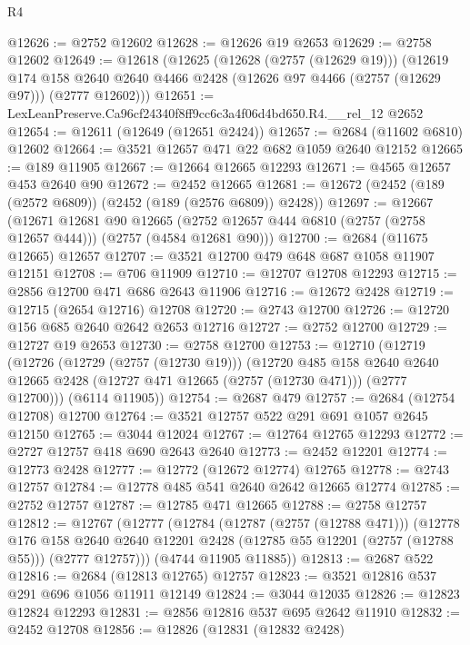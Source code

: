 \begin{lexlean}{R4}
\begin{coremodule}
@12626 := @2752 @12602
@12628 := @12626 @19 @2653
@12629 := @2758 @12602
@12649 := @12618
    (@12625
      (@12628 (@2757 (@12629 @19)))
      (@12619
        @174
        @158
        @2640
        @2640
        @4466
        @2428
        (@12626 @97 @4466 (@2757 (@12629 @97)))
        (@2777 @12602)))
@12651 := LexLeanPreserve.Ca96cf24340f8ff9cc6c3a4f06d4bd650.R4.__rel_12 @2652
@12654 := @12611 (@12649 (@12651 @2424))
@12657 := @2684 (@11602 @6810) @12602
@12664 := @3521 @12657 @471 @22 @682 @1059 @2640 @12152
@12665 := @189 @11905
@12667 := @12664 @12665 @12293
@12671 := @4565 @12657 @453 @2640 @90
@12672 := @2452 @12665
@12681 := @12672 (@2452 (@189 (@2572 @6809)) (@2452 (@189 (@2576 @6809)) @2428))
@12697 := @12667
    (@12671
      @12681
      @90
      @12665
      (@2752 @12657 @444 @6810 (@2757 (@2758 @12657 @444)))
      (@2757 (@4584 @12681 @90)))
@12700 := @2684 (@11675 @12665) @12657
@12707 := @3521 @12700 @479 @648 @687 @1058 @11907 @12151
@12708 := @706 @11909
@12710 := @12707 @12708 @12293
@12715 := @2856 @12700 @471 @686 @2643 @11906
@12716 := @12672 @2428
@12719 := @12715 (@2654 @12716) @12708
@12720 := @2743 @12700
@12726 := @12720 @156 @685 @2640 @2642 @2653 @12716
@12727 := @2752 @12700
@12729 := @12727 @19 @2653
@12730 := @2758 @12700
@12753 := @12710
    (@12719
      (@12726
        (@12729 (@2757 (@12730 @19)))
        (@12720
          @485
          @158
          @2640
          @2640
          @12665
          @2428
          (@12727 @471 @12665 (@2757 (@12730 @471)))
          (@2777 @12700)))
      (@6114 @11905))
@12754 := @2687 @479
@12757 := @2684 (@12754 @12708) @12700
@12764 := @3521 @12757 @522 @291 @691 @1057 @2645 @12150
@12765 := @3044 @12024
@12767 := @12764 @12765 @12293
@12772 := @2727 @12757 @418 @690 @2643 @2640
@12773 := @2452 @12201
@12774 := @12773 @2428
@12777 := @12772 (@12672 @12774) @12765
@12778 := @2743 @12757
@12784 := @12778 @485 @541 @2640 @2642 @12665 @12774
@12785 := @2752 @12757
@12787 := @12785 @471 @12665
@12788 := @2758 @12757
@12812 := @12767
    (@12777
      (@12784
        (@12787 (@2757 (@12788 @471)))
        (@12778
          @176
          @158
          @2640
          @2640
          @12201
          @2428
          (@12785 @55 @12201 (@2757 (@12788 @55)))
          (@2777 @12757)))
      (@4744 @11905 @11885))
@12813 := @2687 @522
@12816 := @2684 (@12813 @12765) @12757
@12823 := @3521 @12816 @537 @291 @696 @1056 @11911 @12149
@12824 := @3044 @12035
@12826 := @12823 @12824 @12293
@12831 := @2856 @12816 @537 @695 @2642 @11910
@12832 := @2452 @12708
@12856 := @12826
    (@12831
      (@12832 @2428)

\end{coremodule}
\end{lexlean}
